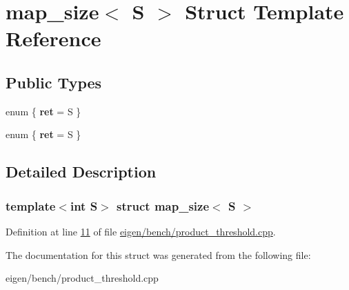 \hypertarget{structmap__size}{}\section{map\+\_\+size$<$ S $>$ Struct Template Reference}
\label{structmap__size}
\subsection*{Public Types}
\begin{DoxyCompactItemize}
\item 
\mbox{\label{structmap__size_a93e16511610914de1ec4926f3050149c}} 
enum \{ {\bfseries ret} = S
 \}
\item 
\mbox{\label{structmap__size_a026134d2e86c0889feff881bc567e562}} 
enum \{ {\bfseries ret} = S
 \}
\end{DoxyCompactItemize}


\subsection{Detailed Description}
\subsubsection*{template$<$int S$>$\newline
struct map\+\_\+size$<$ S $>$}



Definition at line \hyperlink{eigen_2bench_2product__threshold_8cpp_source_l00011}{11} of file \hyperlink{eigen_2bench_2product__threshold_8cpp_source}{eigen/bench/product\+\_\+threshold.\+cpp}.



The documentation for this struct was generated from the following file\+:\begin{DoxyCompactItemize}
\item 
eigen/bench/product\+\_\+threshold.\+cpp\end{DoxyCompactItemize}
